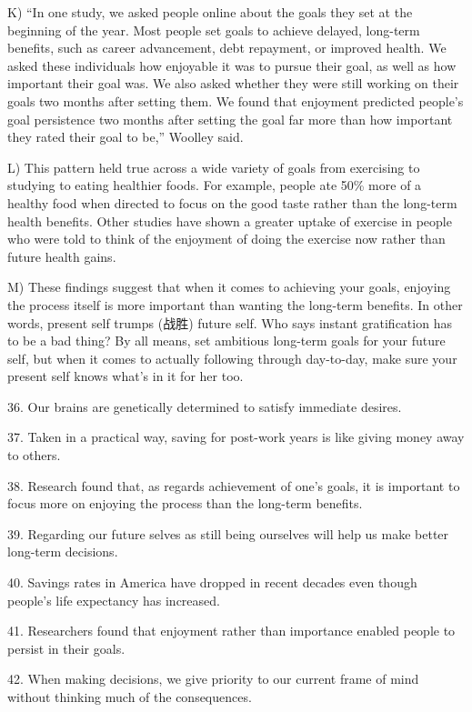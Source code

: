\documentclass[UTF8,11pt]{ctexart}
\begin{document}
K) “In one study, we asked people online about the goals they set at the beginning of the year. Most people set goals to achieve delayed, long-term benefits, such as career advancement, debt repayment, or improved health. We asked these individuals how enjoyable it was to pursue their goal, as well as how important their goal was. We also asked whether they were still working on their goals two months after setting them. We found that enjoyment predicted people’s goal persistence two months after setting the goal far more than how important they rated their goal to be,” Woolley said.


L) This pattern held true across a wide variety of goals from exercising to studying to eating healthier foods. For example, people ate 50\% more of a healthy food when directed to focus on the good taste rather than the long-term health benefits. Other studies have shown a greater uptake of exercise in people who were told to think of the enjoyment of doing the exercise now rather than future health gains.


M) These findings suggest that when it comes to achieving your goals, enjoying the process itself is more important than wanting the long-term benefits. In other words, present self trumps (战胜) future self. Who says instant gratification has to be a bad thing? By all means, set ambitious long-term goals for your future self, but when it comes to actually following through day-to-day, make sure your present self knows what’s in it for her too.


36. Our brains are genetically determined to satisfy immediate desires.


37. Taken in a practical way, saving for post-work years is like giving money away to others.


38. Research found that, as regards achievement of one’s goals, it is important to focus more on enjoying the process than the long-term benefits.


39. Regarding our future selves as still being ourselves will help us make better long-term decisions.


40. Savings rates in America have dropped in recent decades even though people’s life expectancy has increased.


41. Researchers found that enjoyment rather than importance enabled people to persist in their goals.


42. When making decisions, we give priority to our current frame of mind without thinking much of the consequences.
\end{document}
